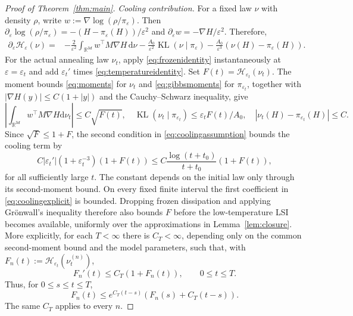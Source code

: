 \documentclass[11pt]{article}
\theoremstyle{definition}
\newcommand{\R}{\mathbb R}
\newcommand{\dd}{\mathrm d}
\newcommand{\KL}{\operatorname{KL}}
\newcommand{\cH}{\mathcal H}
\newcommand{\eps}{\varepsilon}
\begin{document}
\begin{proof}[Proof of Theorem~\ref{thm:main}]
\emph{Cooling contribution.}
For a fixed law $\nu$ with density $\rho$, write
$w:=\nabla\log(\rho/\pi_\eps)$. Then
$\partial_\eps\log(\rho/\pi_\eps)=-(H-\pi_\eps(H))/\eps^2$ and
$\partial_\eps w=-\nabla H/\eps^2$. Therefore,
\begin{align}\label{eq:temperatureidentity}
 \partial_\eps\cH_\eps(\nu)
 ={}&-\frac{2}{\eps^2}\int_{\R^{3d}} w^\top M\nabla H\,\dd\nu
 -\frac{A_0}{\eps^2}\KL(\nu\mid\pi_\eps)
 -\frac{A_0}{\eps^3}\left(\nu(H)-\pi_\eps(H)\right).
\end{align}
For the actual annealing law $\nu_t$, apply \eqref{eq:frozenidentity}
instantaneously at $\eps=\eps_t$ and add $\eps_t'$ times
\eqref{eq:temperatureidentity}. Set $F(t)=\cH_{\eps_t}(\nu_t)$. The moment
bounds \eqref{eq:moments} for $\nu_t$ and \eqref{eq:gibbsmoments} for
$\pi_{\eps_t}$, together with $|\nabla H(y)|\leq C(1+|y|)$ and the
Cauchy--Schwarz inequality, give
\[
 \left|\int_{\R^{3d}} w^\top M\nabla H\dd\nu_t\right|\leq C\sqrt{F(t)},
 \quad \KL(\nu_t\mid\pi_{\eps_t})\leq\eps_t F(t)/A_0,
 \quad |\nu_t(H)-\pi_{\eps_t}(H)|\leq C.
\]
Since $\sqrt F\leq1+F$, the second condition in
\eqref{eq:coolingassumption} bounds the cooling term by
\begin{equation}\label{eq:coolingexplicit}
 C|\eps_t'|\left(1+\eps_t^{-3}\right)(1+F(t))
 \leq C\frac{\log(t+t_0)}{t+t_0}(1+F(t)),
\end{equation}
for all sufficiently large $t$. The constant depends on the initial law
only through its second-moment bound. On every fixed finite interval the
first coefficient in \eqref{eq:coolingexplicit} is bounded. Dropping frozen
dissipation and applying Gr\"{o}nwall's inequality therefore also bounds $F$ before the
low-temperature LSI becomes available, uniformly over the approximations
in Lemma~\ref{lem:closure}.
More explicitly, for each $T<\infty$ there is $C_T<\infty$, depending only
on the common second-moment bound and the model parameters, such that, with
$F_n(t):=\cH_{\eps_t}\left(\nu_t^{(n)}\right)$,
\[
 F_n'(t)\leq C_T(1+F_n(t)),\qquad 0\leq t\leq T.
\]
Thus, for $0\leq s\leq t\leq T$,
\[
 F_n(t)
 \leq e^{C_T(t-s)}\left(F_n(s)+C_T(t-s)\right).
\]
The same $C_T$ applies to every $n$.


\end{proof}
\end{document}
